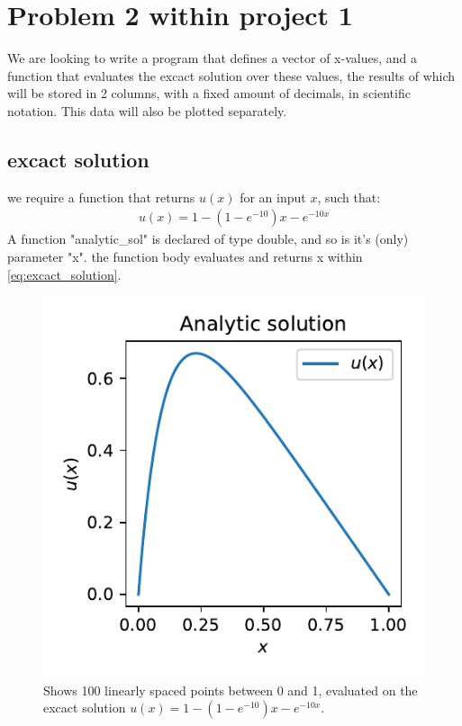 \documentclass{article}
\begin{document}
\section{Problem 2 within project 1}
We are looking to write a program that defines a vector of x-values, and a function that evaluates the excact solution over these values, the results of which
will be stored in 2 columns, with a fixed amount of decimals, in scientific notation. This data will also be plotted separately.
\subsection*{excact solution}
we require a function that returns $u(x)$ for an input $x$, such that:
\begin{align}    
    \label{eq:excact_solution}
    u(x) =  1 - (1-e^{-10})x - e^{-10x}
\end{align}
A function "analytic\_sol" is declared of type double, and so is it's (only) parameter "x". the function body evaluates and returns x within 
\ref{eq:excact_solution}.


\begin{figure}
    \includegraphics{problem_2_fig.pdf}
    \caption{Shows 100 linearly spaced points between 0 and 1, evaluated on the excact solution $u(x)=1 - (1 - e^{-10})x - e^{-10x}$.}
\end{figure}
\end{document}

